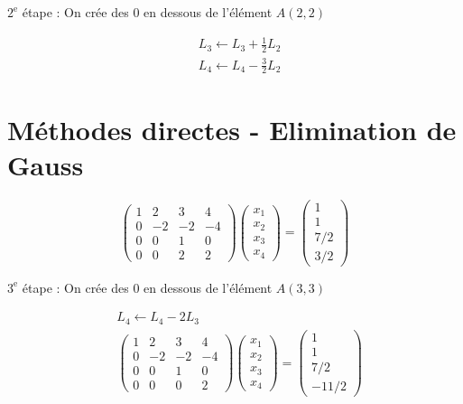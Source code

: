 \documentclass[10pt]{article}
\begin{document}
\(2^{\mathrm{e}}\) étape : On crée des 0 en dessous de l'élément \(A(2,2)\)

\[
\begin{aligned}
& L_{3} \leftarrow L_{3}+\frac{1}{2} L_{2} \\
& L_{4} \leftarrow L_{4}-\frac{3}{2} L_{2}
\end{aligned}
\]

\section*{Méthodes directes - Elimination de Gauss}
\[
\left(\begin{array}{cccc}
1 & 2 & 3 & 4 \\
0 & -2 & -2 & -4 \\
0 & 0 & 1 & 0 \\
0 & 0 & 2 & 2
\end{array}\right)\left(\begin{array}{l}
x_{1} \\
x_{2} \\
x_{3} \\
x_{4}
\end{array}\right)=\left(\begin{array}{c}
1 \\
1 \\
7 / 2 \\
3 / 2
\end{array}\right)
\]

\(3^{\mathrm{e}}\) étape : On crée des 0 en dessous de l'élément \(A(3,3)\)

\[
\begin{aligned}
& L_{4} \leftarrow L_{4}-2 L_{3} \\
& \left(\begin{array}{cccc}
1 & 2 & 3 & 4 \\
0 & -2 & -2 & -4 \\
0 & 0 & 1 & 0 \\
0 & 0 & 0 & 2
\end{array}\right)\left(\begin{array}{l}
x_{1} \\
x_{2} \\
x_{3} \\
x_{4}
\end{array}\right)=\left(\begin{array}{c}
1 \\
1 \\
7 / 2 \\
-11 / 2
\end{array}\right)
\end{aligned}
\]
\end{document}
